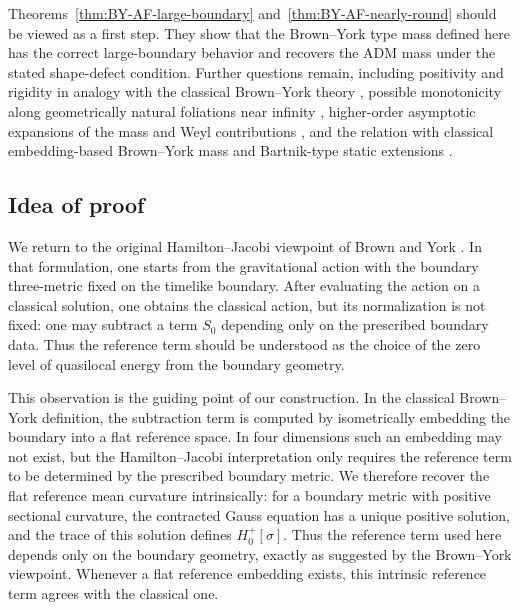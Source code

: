 \documentclass[10pt]{amsart}
\theoremstyle{plain}
\theoremstyle{remark}
\begin{document}
	
	
	
	
	Theorems~\ref{thm:BY-AF-large-boundary} and~\ref{thm:BY-AF-nearly-round} should be viewed as a first step. They show that the
	Brown--York type mass defined here has the correct large-boundary behavior and
	recovers the ADM mass under the stated shape-defect condition. Further
	questions remain, including positivity and rigidity in analogy with the
	classical Brown--York theory \cite{ShiTam02}, possible monotonicity along
	geometrically natural foliations near infinity \cite{HuiskenIlmanen,HuiskenYau},
	higher-order asymptotic expansions of the mass and Weyl contributions
	\cite{BH,WY}, and the relation with classical embedding-based Brown--York mass
	and Bartnik-type static extensions
	\cite{BrownYork,FanShiTam,LiWeinstein,Bartnik89,MiaoShiTam,Anderson13,McCormick24}.
	
	
	\subsection{Idea of proof}
	
	We return to the original
	Hamilton--Jacobi viewpoint of Brown and York \cite{BrownYork}. In that
	formulation, one starts from the gravitational action with the boundary
	three-metric fixed on the timelike boundary. After evaluating the action on a classical solution, one obtains the classical action, but its normalization is not fixed: one may subtract a term $S_0$ depending only on the prescribed boundary data. Thus the reference term should be understood as the choice of the zero level of quasilocal energy from the boundary geometry.
	
	This observation is the guiding point of our construction. In the classical
	Brown--York definition, the subtraction term is computed by isometrically
	embedding the boundary into a flat reference space. In four dimensions such an
	embedding may not exist, but the Hamilton--Jacobi interpretation only requires
	the reference term to be determined by the prescribed boundary metric. We
	therefore recover the flat reference mean curvature intrinsically: for a
	boundary metric with positive sectional curvature, the contracted Gauss
	equation has a unique positive solution, and the trace of this solution defines
	$H_0^+[\sigma]$. Thus the reference term used here depends only on the boundary
	geometry, exactly as suggested by the Brown--York viewpoint. Whenever a flat
	reference embedding exists, this intrinsic reference term agrees with the
	classical one.
	
\end{document}
